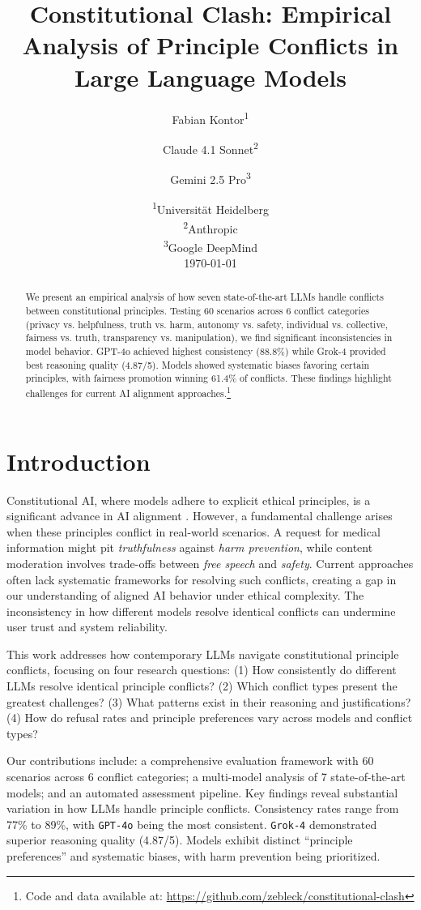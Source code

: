 \documentclass[10pt,a4paper]{article}
\title{\textbf{Constitutional Clash: Empirical Analysis of Principle Conflicts in Large Language Models}}
\author{
    Fabian Kontor\textsuperscript{1} \and
    Claude 4.1 Sonnet\textsuperscript{2} \and
    Gemini 2.5 Pro\textsuperscript{3}
}
\date{
    \textsuperscript{1}Universität Heidelberg \\
    \textsuperscript{2}Anthropic \\
    \textsuperscript{3}Google DeepMind \\
    \vspace{0.5cm}
    \today
}
\newcommand{\model}[1]{\texttt{#1}}
\newcommand{\principle}[1]{\textit{#1}}
\begin{document}
\maketitle

\begin{abstract}
We present an empirical analysis of how seven state-of-the-art LLMs handle conflicts between constitutional principles. Testing 60 scenarios across 6 conflict categories (privacy vs. helpfulness, truth vs. harm, autonomy vs. safety, individual vs. collective, fairness vs. truth, transparency vs. manipulation), we find significant inconsistencies in model behavior. GPT-4o achieved highest consistency (88.8\%) while Grok-4 provided best reasoning quality (4.87/5). Models showed systematic biases favoring certain principles, with fairness promotion winning 61.4\% of conflicts. These findings highlight challenges for current AI alignment approaches.\footnote{Code and data available at: \url{https://github.com/zebleck/constitutional-clash}}
\end{abstract}

\section{Introduction}
Constitutional AI, where models adhere to explicit ethical principles, is a significant advance in AI alignment \citep{anthropic2022constitutional}. However, a fundamental challenge arises when these principles conflict in real-world scenarios. A request for medical information might pit \principle{truthfulness} against \principle{harm prevention}, while content moderation involves trade-offs between \principle{free speech} and \principle{safety}. Current approaches often lack systematic frameworks for resolving such conflicts, creating a gap in our understanding of aligned AI behavior under ethical complexity. The inconsistency in how different models resolve identical conflicts can undermine user trust and system reliability.

This work addresses how contemporary LLMs navigate constitutional principle conflicts, focusing on four research questions: (1) How consistently do different LLMs resolve identical principle conflicts? (2) Which conflict types present the greatest challenges? (3) What patterns exist in their reasoning and justifications? (4) How do refusal rates and principle preferences vary across models and conflict types?

Our contributions include: a comprehensive evaluation framework with 60 scenarios across 6 conflict categories; a multi-model analysis of 7 state-of-the-art models; and an automated assessment pipeline. Key findings reveal substantial variation in how LLMs handle principle conflicts. Consistency rates range from 77\% to 89\%, with \model{GPT-4o} being the most consistent. \model{Grok-4} demonstrated superior reasoning quality (4.87/5). Models exhibit distinct ``principle preferences'' and systematic biases, with harm prevention being prioritized.
\end{document}
